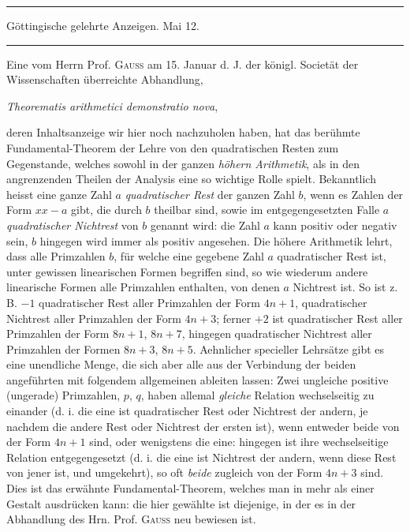 \clearpage{}%
\renewcommand{\BookRunningTitle}{Anzeigen eigner Schriften}
\begin{center}
\rule{.86\linewidth}{.3pt}\par
Göttingische gelehrte Anzeigen. Mai 12.\par
\rule{.86\linewidth}{.3pt}
\end{center}

Eine vom Herrn Prof. \textsc{Gauss} am 15. Januar d. J. der königl. Societät der Wissenschaften überreichte Abhandlung,
\begin{center}\emph{Theorematis arithmetici demonstratio nova},\end{center}
deren Inhaltsanzeige wir hier noch nachzuholen haben, hat das berühmte Fundamental-Theorem der Lehre von den quadratischen Resten zum Gegenstande, welches sowohl in der ganzen \emph{höhern Arithmetik}, als in den angrenzenden Theilen der Analysis eine so wichtige Rolle spielt. Bekanntlich heisst eine ganze Zahl $a$ \emph{quadratischer Rest} der ganzen Zahl $b$, wenn es Zahlen der Form $xx-a$ gibt, die durch $b$ theilbar sind, sowie im entgegengesetzten Falle $a$ \emph{quadratischer Nichtrest} von $b$ genannt wird: die Zahl $a$ kann positiv oder negativ sein, $b$ hingegen wird immer als positiv angesehen. Die höhere Arithmetik lehrt, dass alle Primzahlen $b$, für welche eine gegebene Zahl $a$ quadratischer Rest ist, unter gewissen linearischen Formen begriffen sind, so wie wiederum andere linearische Formen alle Primzahlen enthalten, von denen $a$ Nichtrest ist. So ist z. B. $-1$ quadratischer Rest aller Primzahlen der Form $4n+1$, quadratischer Nichtrest aller Primzahlen der Form $4n+3$; ferner $+2$ ist quadratischer Rest aller Primzahlen der Form $8n+1$, $8n+7$, hingegen quadratischer Nichtrest aller Primzahlen der Formen $8n+3$, $8n+5$. Aehnlicher specieller Lehrsätze gibt es eine unendliche Menge, die sich aber alle aus der Verbindung der beiden angeführten
%
mit folgendem allgemeinen ableiten lassen: Zwei ungleiche positive (ungerade) Primzahlen, $p$, $q$, haben allemal \emph{gleiche} Relation wechselseitig zu einander (d. i. die eine ist quadratischer Rest oder Nichtrest der andern, je nachdem die andere Rest oder Nichtrest der ersten ist), wenn entweder beide von der Form $4n+1$ sind, oder wenigstens die eine: hingegen ist ihre wechselseitige Relation entgegengesetzt (d. i. die eine ist Nichtrest der andern, wenn diese Rest von jener ist, und umgekehrt), so oft \emph{beide} zugleich von der Form $4n+3$ sind. Dies ist das erwähnte Fundamental-Theorem, welches man in mehr als einer Gestalt ausdrücken kann: die hier gewählte ist diejenige, in der es in der Abhandlung des Hrn. Prof. \textsc{Gauss} neu bewiesen ist.

